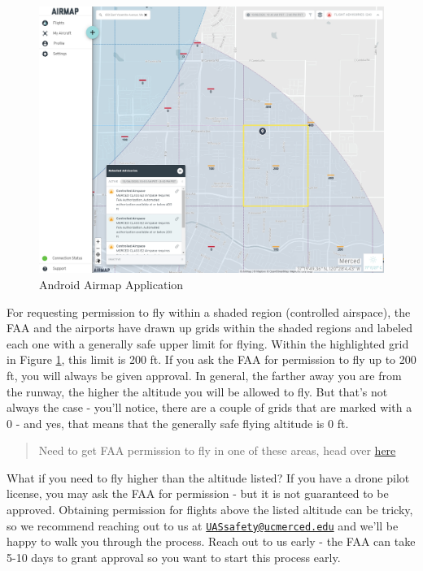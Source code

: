 \documentclass[
]{book}
\begin{document}
\begin{figure}

{\centering \includegraphics[width=0.85\linewidth]{images/Airmap-webpage} 

}

\caption{Android Airmap Application}\label{fig:airmap-web}
\end{figure}

For requesting permission to fly within a shaded region (controlled airspace), the FAA and the airports have drawn up grids within the shaded regions and labeled each one with a generally safe upper limit for flying. Within the highlighted grid in Figure \ref{fig:airmap-web}, this limit is 200 ft. If you ask the FAA for permission to fly up to 200 ft, you will always be given approval. In general, the farther away you are from the runway, the higher the altitude you will be allowed to fly. But that's not always the case - you'll notice, there are a couple of grids that are marked with a 0 - and yes, that means that the generally safe flying altitude is 0 ft.

\begin{quote}
Need to get FAA permission to fly in one of these areas, head over \protect\hyperlink{ch-LAANC}{here}
\end{quote}

What if you need to fly higher than the altitude listed? If you have a drone pilot license, you may ask the FAA for permission - but it is not guaranteed to be approved. Obtaining permission for flights above the listed altitude can be tricky, so we recommend reaching out to us at \href{mailto:UASsafety@ucmerced.edu}{\nolinkurl{UASsafety@ucmerced.edu}} and we'll be happy to walk you through the process. Reach out to us early - the FAA can take 5-10 days to grant approval so you want to start this process early.
\end{document}
